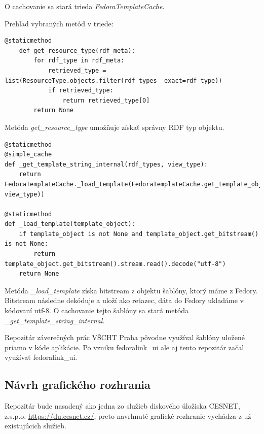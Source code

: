 \documentclass[thesis=M,slovak]{FITthesis}[2013/05/06]
\begin{document}
O cachovanie sa stará trieda {\em FedoraTemplateCache}.

Prehľad vybraných metód v triede:
\begin{lstlisting}[frame=single] 
@staticmethod
    def get_resource_type(rdf_meta):
        for rdf_type in rdf_meta:
            retrieved_type = list(ResourceType.objects.filter(rdf_types__exact=rdf_type))
            if retrieved_type:
                return retrieved_type[0]
        return None
\end{lstlisting}
Metóda {\em get\_resource\_type} umožňuje získať správny RDF typ objektu.

\begin{lstlisting}[frame=single] 
@staticmethod
@simple_cache
def _get_template_string_internal(rdf_types, view_type):
    return FedoraTemplateCache._load_template(FedoraTemplateCache.get_template_object(rdf_types, view_type))

@staticmethod
def _load_template(template_object):
    if template_object is not None and template_object.get_bitstream() is not None:
        return template_object.get_bitstream().stream.read().decode("utf-8")
    return None
\end{lstlisting}
Metóda {\em \_load\_template} získa bitstream z objektu šablóny, ktorý máme z Fedory. Bitstream následne dekóduje a uloží ako reťazec, dáta do Fedory ukladáme v kódovaní \mbox{utf-8}. O cachovanie tejto šablóny sa stará metóda {\em \_get\_template\_string\_internal}.

Repozitár záverečných prác VŠCHT Praha pôvodne využíval šablóny uložené priamo v kóde aplikácie. Po vzniku fedoralink\_ui ale aj tento repozitár začal využívať fedoralink\_ui.

\subsection{Návrh grafického rozhrania}
Repozitár bude nasadený ako jedna zo služieb diskového úložiska CESNET, z.s.p.o. \url{https://du.cesnet.cz/}, preto navrhnuté grafické rozhranie vychádza z už existujúcich služieb.
\end{document}
